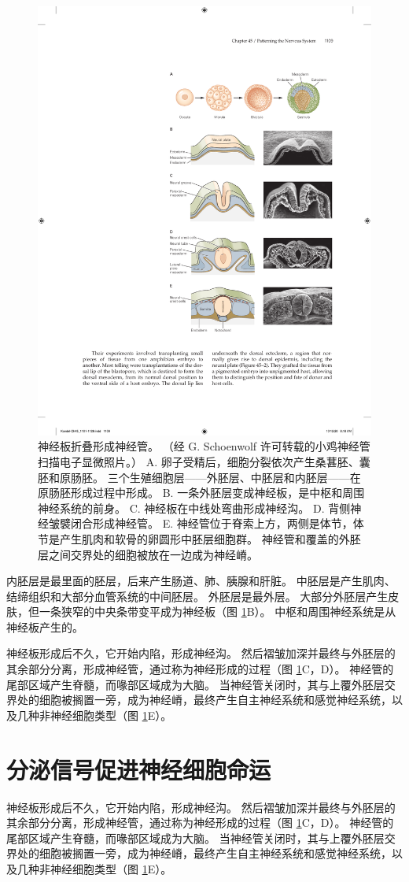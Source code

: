\begin{figure}[htbp]
	\centering
	\includegraphics[width=0.65\linewidth]{chap45/fig_45_1}
	\caption{神经板折叠形成神经管。 （经 G. Schoenwolf 许可转载的小鸡神经管扫描电子显微照片。） A. 卵子受精后，细胞分裂依次产生桑葚胚、囊胚和原肠胚。 三个生殖细胞层——外胚层、中胚层和内胚层——在原肠胚形成过程中形成。 B. 一条外胚层变成神经板，是中枢和周围神经系统的前身。 C. 神经板在中线处弯曲形成神经沟。 D. 背侧神经皱襞闭合形成神经管。 E. 神经管位于脊索上方，两侧是体节，体节是产生肌肉和软骨的卵圆形中胚层细胞群。 神经管和覆盖的外胚层之间交界处的细胞被放在一边成为神经嵴。}
	\label{fig:45_1}
\end{figure}

内胚层是最里面的胚层，后来产生肠道、肺、胰腺和肝脏。 中胚层是产生肌肉、结缔组织和大部分血管系统的中间胚层。 外胚层是最外层。 大部分外胚层产生皮肤，但一条狭窄的中央条带变平成为神经板（图 \ref{fig:45_1}B）。 中枢和周围神经系统是从神经板产生的。

神经板形成后不久，它开始内陷，形成神经沟。 然后褶皱加深并最终与外胚层的其余部分分离，形成神经管，通过称为神经形成的过程（图 \ref{fig:45_1}C，D）。 神经管的尾部区域产生脊髓，而喙部区域成为大脑。 当神经管关闭时，其与上覆外胚层交界处的细胞被搁置一旁，成为神经嵴，最终产生自主神经系统和感觉神经系统，以及几种非神经细胞类型（图 \ref{fig:45_1}E）。

\section{分泌信号促进神经细胞命运}
神经板形成后不久，它开始内陷，形成神经沟。 然后褶皱加深并最终与外胚层的其余部分分离，形成神经管，通过称为神经形成的过程（图 \ref{fig:45_1}C，D）。 神经管的尾部区域产生脊髓，而喙部区域成为大脑。 当神经管关闭时，其与上覆外胚层交界处的细胞被搁置一旁，成为神经嵴，最终产生自主神经系统和感觉神经系统，以及几种非神经细胞类型（图 \ref{fig:45_1}E）。

